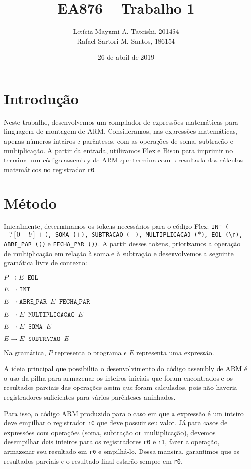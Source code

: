 \documentclass[brazilian,a4paper,twocolumn]{article}
\title{EA876 -- Trabalho 1}
\author{Letícia Mayumi A. Tateishi, 201454\\Rafael Sartori M. Santos, 186154}
\date{26 de abril de 2019}
\newcommand{\s}{\;\;}
\begin{document}
\maketitle

\section{Introdução}

    Neste trabalho, desenvolvemos um compilador de expressões matemáticas para linguagem de montagem de ARM. Consideramos, nas expressões matemáticas, apenas números inteiros e parênteses, com as operações de soma, subtração e multiplicação. A partir da entrada, utilizamos Flex e Bison para imprimir no terminal um código assembly de ARM que termina com o resultado dos cálculos matemáticos no registrador \texttt{r0}.

\section{Método}

    Inicialmente, determinamos os tokens necessários para o código Flex: \texttt{INT ($-?[0-9]+$), SOMA ($+$), SUBTRACAO ($-$), MULTIPLICACAO ($*$), EOL (\textbackslash{}n), ABRE\_PAR (()} e \texttt{FECHA\_PAR ())}. A partir desses tokens, priorizamos a operação de multiplicação em relação à soma e à subtração e desenvolvemos a seguinte gramática livre de contexto:

    $P \xrightarrow{} E \s \texttt{EOL}$

    $E \xrightarrow{} \texttt{INT}$

    $E \xrightarrow{} \texttt{ABRE\_PAR} \s E \s \texttt{FECHA\_PAR}$

    $E \xrightarrow{} E \s \texttt{MULTIPLICACAO} \s E$

    $E \xrightarrow{} E \s \texttt{SOMA} \s E$

    $E \xrightarrow{} E \s \texttt{SUBTRACAO} \s E$

    Na gramática, $P$ representa o programa e $E$ representa uma expressão.

    A ideia principal que possibilita o desenvolvimento do código assembly de ARM é o uso da pilha para armazenar os inteiros iniciais que foram encontrados e os resultados parciais das operações assim que foram calculados, pois não haveria registradores suficientes para vários parênteses aninhados.

    Para isso, o código ARM produzido para o caso em que a expressão é um inteiro deve empilhar o registrador \texttt{r0} que deve possuir seu valor. Já para casos de expressões com operações (soma, subtração ou multiplicação), devemos desempilhar dois inteiros para os registradores \texttt{r0} e \texttt{r1}, fazer a operação, armazenar seu resultado em \texttt{r0} e empilhá-lo. Dessa maneira, garantimos que os resultados parciais e o resultado final estarão sempre em \texttt{r0}.
\end{document}
